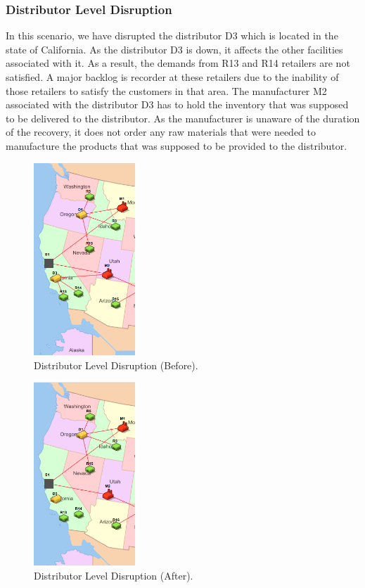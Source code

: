  \subsubsection{Distributor Level Disruption}
 
 In this scenario, we have disrupted the distributor D3 which is located in the state of California. As the distributor D3 is down, it affects the other facilities associated with it. As a result, the demands from R13 and R14 retailers are not satisfied. A major backlog is recorder at these retailers due to the inability of those retailers to satisfy the customers in that area. The manufacturer M2 associated with the distributor D3 has to hold the inventory that was supposed to be delivered to the distributor. As the manufacturer is unaware of the duration of the recovery, it does not order any raw materials that were needed to manufacture the products that was supposed to be provided to the distributor. 
 
 \begin{figure}[H]
   \centering
    \includegraphics[width=1.5in]{figures/pdf/BeforeD.png} 
     \caption{Distributor Level Disruption (Before).}
     \label{fig:DLDb}
 \end{figure}
 
 \begin{figure}[H]
  \centering
  \includegraphics[width=1.5in]{figures/pdf/AfterD.png}
   \caption{Distributor Level Disruption (After).}
   \label{fig:DLDa}
\end{figure}

